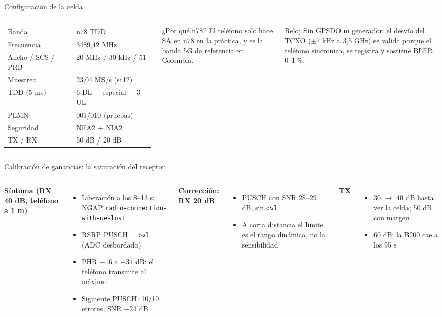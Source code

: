 \documentclass[aspectratio=169,10pt]{beamer}
\begin{document}
\begin{frame}{Configuración de la celda}
\begin{columns}[T]
\small
\begin{tabular}{ll}
\toprule
Banda & n78 TDD \\
Frecuencia & 3489,42 MHz \\
Ancho / SCS / PRB & 20 MHz / 30 kHz / 51 \\
Muestreo & 23,04 MS/s (sc12) \\
TDD (5 ms) & 6 DL + especial + 3 UL \\
PLMN & 001/010 (pruebas) \\
Seguridad & NEA2 + NIA2 \\
TX / RX & 50 dB / 20 dB \\
\bottomrule
\end{tabular}
\begin{block}{¿Por qué n78?}
\small El teléfono solo hace SA en n78 en la práctica, y es la banda 5G de referencia en Colombia.
\end{block}
\begin{block}{Reloj}
\small Sin GPSDO ni generador: el desvío del TCXO ($\pm$7 kHz a 3,5 GHz) se valida porque el teléfono sincroniza, se registra y sostiene BLER 0--1\,\%.
\end{block}
\end{columns}
\end{frame}

\begin{frame}{Calibración de ganancias: la saturación del receptor}
\begin{columns}[T]
\textbf{Síntoma (RX 40 dB, teléfono a 1 m)}
\begin{itemize}\small
  \item Liberación a los 8--13 s: NGAP \texttt{radio-connection-with-ue-lost}
  \item RSRP PUSCH = \texttt{ovl} (ADC desbordado)
  \item PHR $-16$ a $-31$ dB: el teléfono transmite al máximo
  \item Siguiente PUSCH: 10/10 errores, SNR $-24$ dB
\end{itemize}
\textbf{Corrección: RX 20 dB}
\begin{itemize}\small
  \item PUSCH con SNR 28--29 dB, sin \texttt{ovl}
  \item A corta distancia el límite es el rango dinámico, no la sensibilidad
\end{itemize}
\textbf{TX}
\begin{itemize}\small
  \item 30 $\rightarrow$ 40 dB hasta ver la celda; 50 dB con margen
  \item 60 dB: la B200 cae a los 95 s
\end{itemize}
\end{columns}
\end{frame}
\end{document}
